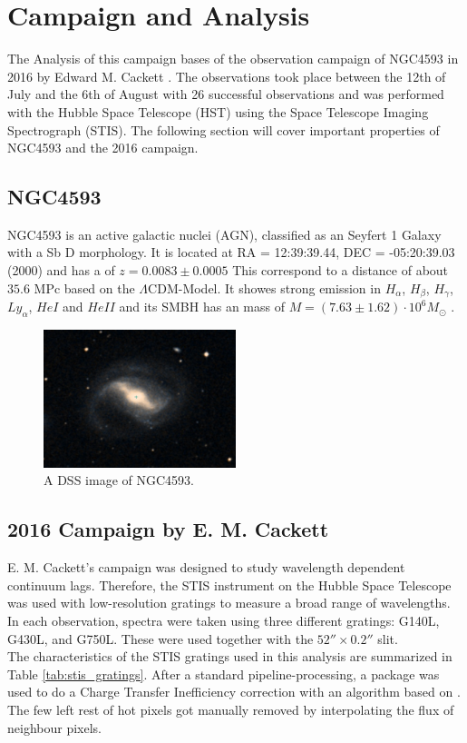 \chapter{Campaign and Analysis}
\label{campaign_and_analysis}
The Analysis of this campaign bases of the observation campaign of NGC4593 in 2016 by Edward M. Cackett \parencite{cackett2018accretion}. The observations took place between the 12th of July and the 6th of August with 26 successful observations and was performed with the Hubble Space Telescope (HST) using the Space Telescope Imaging Spectrograph (STIS). The following section will cover important properties of NGC4593 and the 2016 campaign.

\section{NGC4593}
\label{NGC4593}

NGC4593 is an active galactic nuclei (AGN), classified as an Seyfert 1 Galaxy with a Sb D morphology.  It is located at RA = 12:39:39.44, DEC = -05:20:39.03 (2000) and has a of $ z = 0.0083 \pm 0.0005$ This correspond to a distance of about $35.6$ MPc \parencite{simbaNGC4593}based on the $\Lambda$CDM-Model. It showes strong emission in $H_\alpha$, $H_\beta$, $H_\gamma$, $Ly_\alpha$, $HeI$ and $HeII$ and its SMBH has an mass of $M = \left(7.63 \pm 1.62\right) \cdot 10^6 M_\odot$ \parencite{bentz2015agn}.
\begin{figure}[!ht]
	\centering
	\includegraphics[width=0.5\textwidth]{pictures/Chapter3/NGC4593.PNG}
	\caption{A DSS image of NGC4593.}
	\label{fig:NGC4593}
\end{figure}

\section{2016 Campaign by E. M. Cackett}
\label{Campaign_Cackett}

E. M. Cackett's campaign was designed to study wavelength dependent continuum lags. Therefore, the STIS instrument on the Hubble Space Telescope was used with low-resolution gratings to measure a broad range of wavelengths. In each observation, spectra were taken using three different gratings: G140L, G430L, and G750L. These were used together with the $52'' \times 0.2''$ slit.\\
The characteristics of the STIS gratings used in this analysis are summarized in Table \ref{tab:stis_gratings}. After a standard pipeline-processing, a package was used to do a Charge Transfer Inefficiency correction with an algorithm based on \parencite{anderson2010empirical}. The few left rest of hot pixels got manually removed by interpolating the flux of neighbour pixels.

